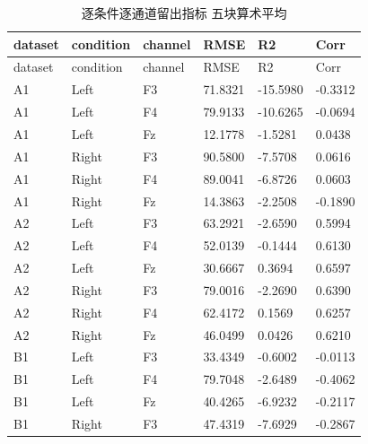 \documentclass[UTF8,a4paper,11pt]{ctexart}
\begin{document}
\small\begin{longtable}{p{.12\linewidth}p{.12\linewidth}p{.12\linewidth}p{.16\linewidth}p{.16\linewidth}p{.16\linewidth}}

\caption{逐条件逐通道留出指标 五块算术平均}\\\toprule

dataset & condition & channel & RMSE & R2 & Corr\\\midrule\endfirsthead

dataset & condition & channel & RMSE & R2 & Corr\\\midrule\endhead

A1 & Left & F3 & 71.8321 & -15.5980 & -0.3312\\

A1 & Left & F4 & 79.9133 & -10.6265 & -0.0694\\

A1 & Left & Fz & 12.1778 & -1.5281 & 0.0438\\

A1 & Right & F3 & 90.5800 & -7.5708 & 0.0616\\

A1 & Right & F4 & 89.0041 & -6.8726 & 0.0603\\

A1 & Right & Fz & 14.3863 & -2.2508 & -0.1890\\

A2 & Left & F3 & 63.2921 & -2.6590 & 0.5994\\

A2 & Left & F4 & 52.0139 & -0.1444 & 0.6130\\

A2 & Left & Fz & 30.6667 & 0.3694 & 0.6597\\

A2 & Right & F3 & 79.0016 & -2.2690 & 0.6390\\

A2 & Right & F4 & 62.4172 & 0.1569 & 0.6257\\

A2 & Right & Fz & 46.0499 & 0.0426 & 0.6210\\

B1 & Left & F3 & 33.4349 & -0.6002 & -0.0113\\

B1 & Left & F4 & 79.7048 & -2.6489 & -0.4062\\

B1 & Left & Fz & 40.4265 & -6.9232 & -0.2117\\

B1 & Right & F3 & 47.4319 & -7.6929 & -0.2867\\


\end{longtable}
\end{document}
